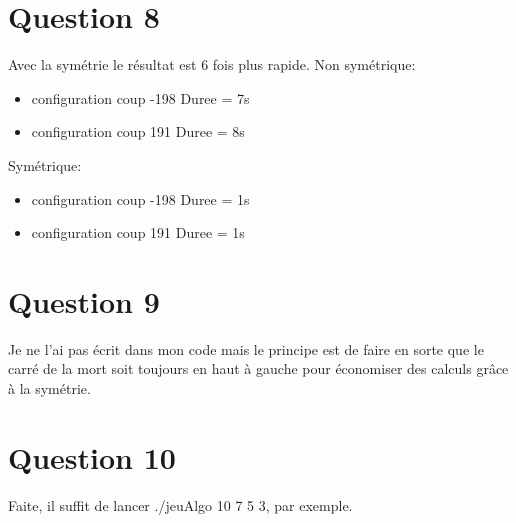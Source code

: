 \documentclass[a4paper,12pt]{report}
\begin{document}
\section*{Question 8}

Avec la symétrie le résultat est 6 fois plus rapide.
Non symétrique: 
\begin{itemize}
\item configuration coup -198 Duree = 7s
\item configuration coup 191 Duree = 8s
\end{itemize}
Symétrique: 
\begin{itemize}
\item configuration coup -198 Duree = 1s
\item configuration coup 191 Duree = 1s
\end{itemize}

\section*{Question 9}

Je ne l'ai pas écrit dans mon code mais le principe est de faire en sorte que le carré de la mort soit toujours en haut à gauche pour économiser des calculs grâce à la symétrie.

\section*{Question 10}
Faite, il suffit de lancer ./jeuAlgo 10 7 5 3, par exemple.
\end{document}
